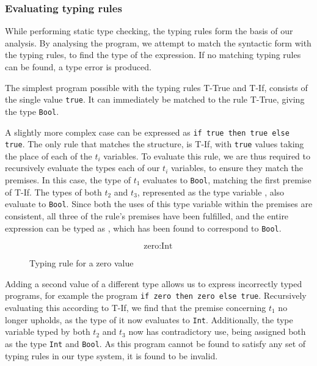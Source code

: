 \documentclass[nofilelist]{cslthse-msc}
\begin{document}
\subsubsection{Evaluating typing rules}
While performing static type checking, the typing rules form the basis of our analysis.
By analysing the program, we attempt to match the syntactic form with the typing rules, to find the type of the expression.
If no matching typing rules can be found, a type error is produced.

The simplest program possible with the typing rules T-True and T-If, consists of the single value \lstinline{true}.
It can immediately be matched to the rule T-True, giving the type \lstinline{Bool}.

A slightly more complex case can be expressed as \lstinline{if true then true else true}.
The only rule that matches the structure, is T-If, with \lstinline{true} values taking the place of each of the $t_i$ variables.
To evaluate this rule, we are thus required to recursively evaluate the types each of our $t_i$ variables, to ensure they match the premises.
In this case, the type of $t_1$ evaluates to \lstinline{Bool}, matching the first premise of T-If.
The types of both $t_2$ and $t_3$, represented as the type variable , also evaluate to \lstinline{Bool}.
Since both the uses of this type variable within the premises are consistent, all three of the rule's premises have been fulfilled, and the entire expression can be typed as , which has been found to correspond to \lstinline{Bool}.

\begin{figure}[h]
  \begin{equation}
    \tag{T-Zero}
    \text{zero} : \text{Int}
  \end{equation}
  \caption{Typing rule for a zero value}
  \label{typingruleexamplezero}
\end{figure}

Adding a second value of a different type allows us to express incorrectly typed programs, for example the program \lstinline{if zero then zero else true}.
Recursively evaluating this according to T-If, we find that the premise concerning $t_1$ no longer upholds, as the type of it now evaluates to \lstinline{Int}.
Additionally, the type variable  typed by both $t_2$ and $t_3$ now has contradictory use, being assigned both as the type \lstinline{Int} and \lstinline{Bool}.
As this program cannot be found to satisfy any set of typing rules in our type system, it is found to be invalid.
\end{document}
